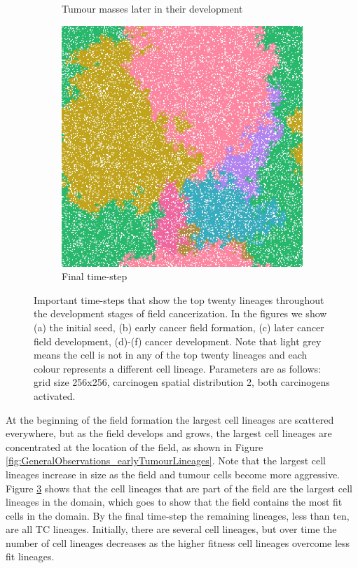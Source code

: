 \documentclass[\main/thesis.tex]{subfiles}
\begin{document}
\begin{figure}[H]
\begin{subfigure}[t]{.45\textwidth}
      \caption{Tumour masses later in their development}
      \label{fig:GeneralObservations_lateTumourLineages}
    \end{subfigure}
    \begin{subfigure}[t]{.45\textwidth}
      \centering
      \includegraphics[width=\textwidth]{images/2_GeneralObservations/Fig6/6_final.jpeg}
      \caption{Final time-step}
      \label{fig:GeneralObservations_finalLineages}
    \end{subfigure}
    \caption{Important time-steps that show the top twenty lineages throughout the development stages of field cancerization. In the figures we show (a) the initial seed, (b) early cancer field formation, (c) later cancer field development, (d)-(f) cancer development. Note that light grey means the cell is not in any of the top twenty lineages and each colour represents a different cell lineage. 
    Parameters are as follows: grid size 256x256, carcinogen spatial distribution 2, both carcinogens activated.}
    \label{fig:GeneralObservations_importantTimeStepsLineages}
\end{figure}
At the beginning of the field formation the largest cell lineages are scattered everywhere, but as the field develops and grows, the largest cell lineages are concentrated at the location of the field, as shown in Figure \ref{fig:GeneralObservations_earlyTumourLineages}. Note that the largest cell lineages increase in size as the field and tumour cells become more aggressive. Figure \ref{fig:GeneralObservations_importantTimeStepsLineages} shows that the cell lineages that are part of the field are the largest cell lineages in the domain, which goes to show that the field contains the most fit cells in the domain. By the final time-step the remaining lineages, less than ten, are all TC lineages. Initially, there are several cell lineages, but over time the number of cell lineages decreases as the higher fitness cell lineages overcome less fit lineages.
\end{document}
